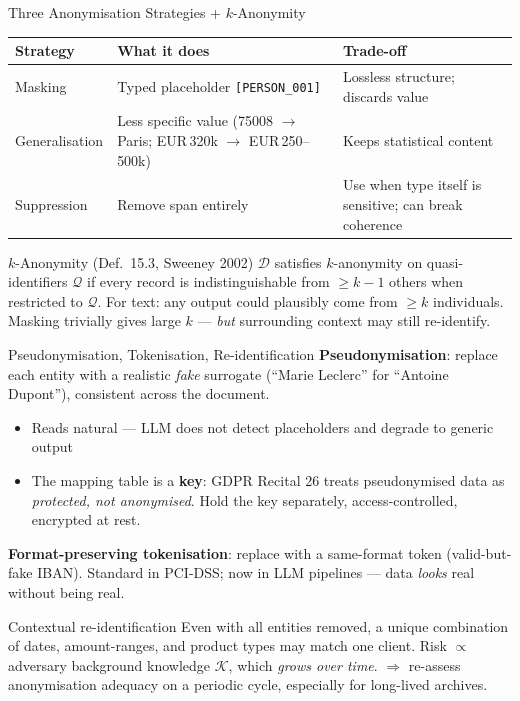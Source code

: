 \documentclass[9pt,t]{beamer}
\begin{document}
\begin{frame}{Three Anonymisation Strategies + $k$-Anonymity}
\begin{tabular}{p{2.2cm}p{4.0cm}p{4.0cm}}
\toprule
\textbf{Strategy} & \textbf{What it does} & \textbf{Trade-off} \\
\midrule
Masking & Typed placeholder \texttt{[PERSON\_001]} & Lossless structure; discards value \\
\addlinespace
Generalisation & Less specific value (75008 $\to$ Paris; EUR\,320k $\to$ EUR\,250--500k) & Keeps statistical content \\
\addlinespace
Suppression & Remove span entirely & Use when type itself is sensitive; can break coherence \\
\bottomrule
\end{tabular}

\medskip
\begin{block}{$k$-Anonymity (Def.\ 15.3, Sweeney 2002)}
$\mathcal{D}$ satisfies $k$-anonymity on quasi-identifiers $\mathcal{Q}$ if every
record is indistinguishable from $\geq k-1$ others when restricted to $\mathcal{Q}$.
For text: any output could plausibly come from $\geq k$ individuals. Masking
trivially gives large $k$ --- \emph{but} surrounding context may still re-identify.
\end{block}
\end{frame}

\begin{frame}{Pseudonymisation, Tokenisation, Re-identification}
\textbf{Pseudonymisation}: replace each entity with a realistic \emph{fake}
surrogate (``Marie Leclerc'' for ``Antoine Dupont''), consistent across the document.
\begin{itemize}
  \item[+] Reads natural --- LLM does not detect placeholders and degrade to generic output
  \item[--] The mapping table is a \textbf{key}: GDPR Recital 26 treats pseudonymised
        data as \emph{protected, not anonymised}. Hold the key separately,
        access-controlled, encrypted at rest.
\end{itemize}

\medskip
\textbf{Format-preserving tokenisation}: replace with a same-format token (valid-but-fake
IBAN). Standard in PCI-DSS; now in LLM pipelines --- data \emph{looks} real without being real.

\medskip
\begin{alertblock}{Contextual re-identification}
Even with all entities removed, a unique combination of dates, amount-ranges, and
product types may match one client. Risk $\propto$ adversary background knowledge
$\mathcal{K}$, which \emph{grows over time}. $\Rightarrow$ re-assess anonymisation
adequacy on a periodic cycle, especially for long-lived archives.
\end{alertblock}
\end{frame}
\end{document}
